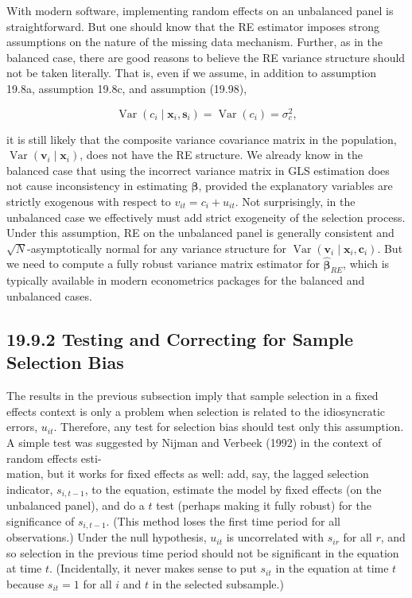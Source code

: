 \documentclass[10pt]{article}
\begin{document}
With modern software, implementing random effects on an unbalanced panel is straightforward. But one should know that the RE estimator imposes strong assumptions on the nature of the missing data mechanism. Further, as in the balanced case, there are good reasons to believe the RE variance structure should not be taken literally. That is, even if we assume, in addition to assumption 19.8a, assumption 19.8c, and assumption (19.98),


\begin{equation*}
\operatorname{Var}\left(c_{i} \mid \mathbf{x}_{i}, \mathbf{s}_{i}\right)=\operatorname{Var}\left(c_{i}\right)=\sigma_{c}^{2}, \tag{19.100}
\end{equation*}


it is still likely that the composite variance covariance matrix in the population, $\operatorname{Var}\left(\mathbf{v}_{i} \mid \mathbf{x}_{i}\right)$, does not have the RE structure. We already know in the balanced case that using the incorrect variance matrix in GLS estimation does not cause inconsistency in estimating $\boldsymbol{\beta}$, provided the explanatory variables are strictly exogenous with respect to $v_{i t}=c_{i}+u_{i t}$. Not surprisingly, in the unbalanced case we effectively must add strict exogeneity of the selection process. Under this assumption, RE on the unbalanced panel is generally consistent and $\sqrt{N}$-asymptotically normal for any variance structure for $\operatorname{Var}\left(\mathbf{v}_{i} \mid \mathbf{x}_{i}, \mathbf{c}_{i}\right)$. But we need to compute a fully robust variance matrix estimator for $\hat{\boldsymbol{\beta}}_{R E}$, which is typically available in modern econometrics packages for the balanced and unbalanced cases.

\subsection*{19.9.2 Testing and Correcting for Sample Selection Bias}
The results in the previous subsection imply that sample selection in a fixed effects context is only a problem when selection is related to the idiosyncratic errors, $u_{i t}$. Therefore, any test for selection bias should test only this assumption. A simple test was suggested by Nijman and Verbeek (1992) in the context of random effects esti-\\
mation, but it works for fixed effects as well: add, say, the lagged selection indicator, $s_{i, t-1}$, to the equation, estimate the model by fixed effects (on the unbalanced panel), and do a $t$ test (perhaps making it fully robust) for the significance of $s_{i, t-1}$. (This method loses the first time period for all observations.) Under the null hypothesis, $u_{i t}$ is uncorrelated with $s_{i r}$ for all $r$, and so selection in the previous time period should not be significant in the equation at time $t$. (Incidentally, it never makes sense to put $s_{i t}$ in the equation at time $t$ because $s_{i t}=1$ for all $i$ and $t$ in the selected subsample.)
\end{document}
